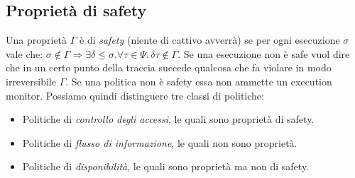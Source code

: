 \documentclass[a4paper,oneside,titlepage]{book}
\begin{document}
\subsection{Proprietà di safety}
Una proprietà $\Gamma$ è di \textit{safety} (niente di cattivo avverrà) se per ogni esecuzione $\sigma$ vale che: $\sigma \notin \Gamma \Rightarrow \exists \delta \leq \sigma. \forall \tau \in \Psi. \, \delta \tau \notin \Gamma$. Se una esecuzione non è safe vuol dire che in un certo punto della traccia succede qualcosa che fa violare in modo irreversibile $\Gamma$. Se una politica non è safety essa non ammette un execution monitor. Possiamo quindi distinguere tre classi di politiche:
\begin{itemize}
    \item Politiche di \textit{controllo degli accessi}, le quali sono proprietà di safety.
    \item Politiche di \textit{flusso di informazione}, le quali non sono proprietà.
    \item Politiche di \textit{disponibilità}, le quali sono proprietà ma non di safety.
\end{itemize}
\end{document}
